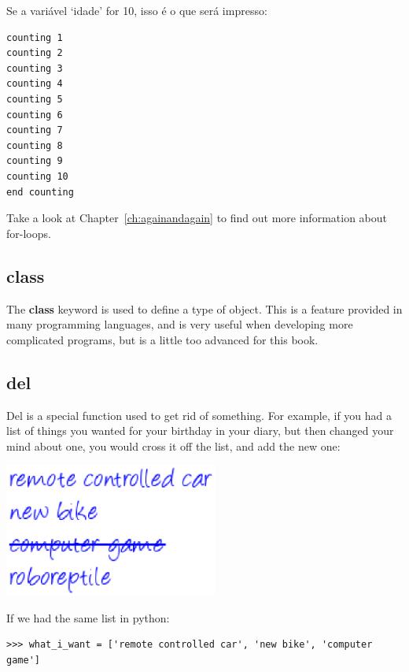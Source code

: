 \noindent
Se a variável `idade' for 10, isso é o que será impresso:

\begin{listing}
\begin{verbatim}
counting 1
counting 2
counting 3
counting 4
counting 5
counting 6
counting 7
counting 8
counting 9
counting 10
end counting
\end{verbatim}
\end{listing}

\noindent
Take a look at Chapter~\ref{ch:againandagain} to find out more information about for-loops.

\subsection*{class}

The \textbf{class} keyword is used to define a type of object. This is a feature provided in many programming languages, and is very useful when developing more complicated programs, but is a little too advanced for this book.

\subsection*{del}

Del is a special function used to get rid of something. For example, if you had a list of things you wanted for your birthday in your diary, but then changed your mind about one, you would cross it off the list, and add the new one:

\begin{center}
\includegraphics*[width=70mm]{eps/list.eps}
\end{center}

\noindent
If we had the same list in python:

\begin{listing}
\begin{verbatim}
>>> what_i_want = ['remote controlled car', 'new bike', 'computer game']
\end{verbatim}
\end{listing}

